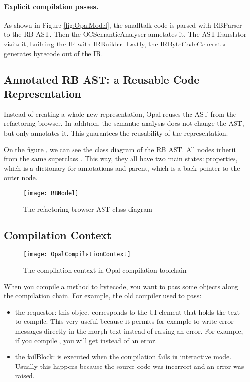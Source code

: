 \documentclass[preprint,10pt]{sigplanconf}
\begin{document}
\paragraph{Explicit compilation passes.}
As shown in Figure \ref{fig:OpalModel}, the smalltalk code is parsed with RBParser to the RB AST. Then the OCSemanticAnalyser annotates it.
The ASTTranslator visits it, building the IR with IRBuilder. Lastly, the IRByteCodeGenerator generates bytecode out of the IR.

\subsection{Annotated RB AST: a Reusable Code Representation}

Instead of creating a whole new representation, Opal reuses the AST from the refactoring browser. In addition, the semantic analysis does not change the AST, but only annotates it. This guarantees the reusability of the representation. 

On the figure , we can see the class diagram of the RB AST. All nodes inherit from the same superclass . This way, they all have two main states: properties, which is a dictionary for annotations and parent, which is a back pointer to the outer node.

\begin{figure}[ht]
\begin{center}
	\texttt{[image: RBModel]}
	\caption{The refactoring browser AST class diagram}
\end{center}
\end{figure}


\subsection{Compilation Context}

\begin{figure}[ht]
\begin{center}
	\texttt{[image: OpalCompilationContext]}
	\caption{The compilation context in Opal compilation toolchain}
\end{center}
\end{figure}

When you compile a method to bytecode, you want to pass some objects along the compilation chain. For example, the old compiler used to pass:

\begin{itemize}
	\item the requestor: this object corresponds to the UI element that holds the text to compile. 
This very useful because it permits for example to write error messages directly in the morph text instead of raising an error.
For example, if you compile \ct{[:y | [:y | y ] ] }, you will get   instead of an error.
	\item the failBlock: is executed when the compilation fails in interactive mode. Usually this happens because the source code was incorrect and an error was raised. 
\end{itemize}
\end{document}

